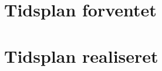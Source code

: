 \section{Tidsplan forventet} \label{sec:tidsplan_forventet}


\section{Tidsplan realiseret} \label{sec:tidsplan_realiseret}